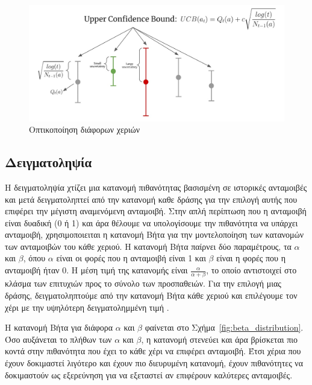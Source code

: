 \begin{figure}
    \centering
    \includegraphics[width=\textwidth]{body_matter/bandits/images/ucb.jpg}
    \caption{Οπτικοποίηση  \cite{yan2022bandit} διάφορων χεριών}
    \label{fig:ucb}
\end{figure}

\subsection{Δειγματοληψία }

Η δειγματοληψία  χτίζει μια κατανομή πιθανότητας βασισμένη σε ιστορικές ανταμοιβές και μετά δειγματοληπτεί από την κατανομή καθε δράσης για την επιλογή αυτής που επιφέρει την μέγιστη αναμενόμενη ανταμοιβή. Στην απλή περίπτωση που η ανταμοιβή είναι δυαδική (0 ή 1) και άρα θέλουμε να υπολογίσουμε την πιθανότητα να υπάρχει ανταμοιβή, χρησιμοποιειται η κατανομή Βήτα για την μοντελοποίηση των κατανομών των ανταμοιβών του κάθε χεριού. Η κατανομή Βήτα παίρνει δύο παραμέτρους, τα $α$ και $β$, όπου $α$ είναι οι φορές που η ανταμοιβή είναι 1 και $β$ είναι η φορές που η ανταμοιβή ήταν $0$. Η μέση τιμή της κατανομής είναι $\frac{α}{α+β}$, το οποίο αντιστοιχεί στο κλάσμα των επιτυχιών προς το σύνολο των προσπαθειών. Για την επιλογή μιας δράσης, δειγματοληπτούμε από την κατανομή Βήτα κάθε χεριού και επιλέγουμε τον χέρι με την υψηλότερη δειγματολημμένη τιμή \cite{thompsonsampling}.

H κατανομή Βήτα για διάφορα $α$ και $β$ φαίνεται στο Σχήμα~\ref{fig:beta_distribution}. Όσο αυξάνεται το πλήθων των $α$ και $β$, η κατανομή στενεύει και άρα βρίσκεται πιο κοντά στην πιθανότητα που έχει το κάθε χέρι να επιφέρει ανταμοιβή. Έτσι χέρια που έχουν δοκιμαστεί λιγότερο και έχουν πιο διευρυμένη κατανομή, έχουν πιθανότητες να δοκιμαστούν ως εξερεύνηση για να εξεταστεί αν επιφέρουν καλύτερες ανταμοιβές.

